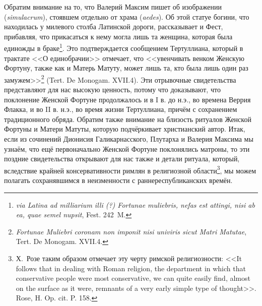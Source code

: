 Обратим внимание на то, что Валерий Максим пишет об изображении (\textit{simulacrum}), стоявшем отдельно от храма (\textit{aedes}). Об этой статуе богини, что находилась у милевого столба Латинской дороги, рассказывает и Фест, прибавляя, что прикасаться к нему могла лишь та женщина, которая была единожды в браке\footnote{\textit{via Latina ad milliarium illi (?) Fortunae muliebris, nefas est attingi, nisi ab ea, quae semel nupsit}, Fest. 242~M.}. Это подтверждается сообщением Тертуллиана, который в трактате <<О единобрачии>> отмечает, что <<увенчивать венком Женскую Фортуну, также как и Матерь Матуту, может лишь та, кто была лишь один раз замужем>>\footnote{\textit{Fortunae Muliebri coronam non imponit nisi univiris sicut Matri Matutae}, Tert. De Monogam. XVII.4.} (Tert. De Monogam. XVII.4). Эти отрывочные свидетельства представляют для нас высокую ценность, потому что доказывают, что поклонение Женской Фортуне продолжалось и в I в. до н.э., во времена Веррия Флакка, и во II в. н.э., во время жизни Тертуллиана, причём с сохранением традиционного обряда. Обратим также внимание на близость ритуалов Женской Фортуны и Матери Матуты, которую подчёркивает христианский автор. Итак, если из сочинений Дионисия Галикарнасского, Плутарха и Валерия Максима мы узнаём, что ещё первоначально Женской Фортуне поклонялись матроны, то эти поздние свидетельства открывают для нас также и детали ритуала, который, вследствие крайней консервативности римлян в религиозной области\footnote{Х.~Розе таким образом отмечает эту черту римской религиозности: <<It follows that in dealing with Roman religion, the department in which that conservative people were most conservative, we can quite easily find, almost on the surface as it were, remnants of a very early simple type of thought>>. Rose, H. Op. cit. P. 158.}, мы можем полагать сохранявшимся в неизменности с раннереспубликанских времён.




